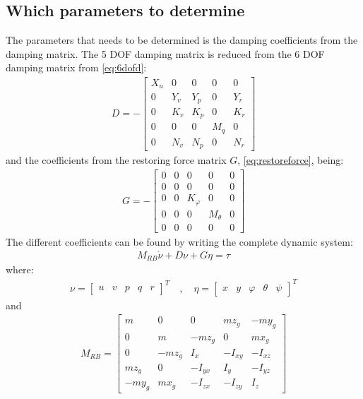 \subsection{Which parameters to determine}
The parameters that needs to be determined is the damping coefficients
from the damping matrix. The 5 \ac{DOF} damping matrix is reduced from the 6 \ac{DOF} damping matrix from \ref{eq:6dofd}:
\begin{align}
D = -
\begin{bmatrix}
X_u & 0 & 0 & 0 & 0\\
0 & Y_v & Y_p & 0 & Y_r\\
0 & K_v & K_p & 0 & K_r\\
0 & 0 & 0 & M_q & 0\\
0 & N_v & N_p & 0 & N_r
\end{bmatrix}
\end{align}
and the coefficients from the restoring force matrix $G$, \ref{eq:restoreforce}, being:
\begin{align}
G = -
\begin{bmatrix}
0 & 0 & 0 & 0 & 0\\
0 & 0 & 0 & 0 & 0\\
0 & 0 & K_\varphi & 0 & 0\\
0 & 0 & 0 & M_\theta & 0\\
0 & 0 & 0 & 0 & 0
\end{bmatrix}
\end{align}
The different coefficients can be found by writing the complete dynamic system:
\begin{align}
M_{RB} \dot \nu + D\nu + G\eta = \tau
\end{align}
where:
\begin{align}
\nu =
\begin{bmatrix}
u & v & p & q & r
\end{bmatrix}^T
\quad , \quad
\eta =
\begin{bmatrix}
x & y & \varphi & \theta & \psi
\end{bmatrix}^T
\end{align}
and
\begin{align}
M_{RB} =
\begin{bmatrix}
m & 0 & 0 & mz_g & -my_g\\
0 & m & -mz_g & 0 & mx_g\\
0 & -mz_g & I_x & -I_{xy} & -I_{xz}\\
mz_g & 0 & -I_{yx} & I_y & -I_{yz}\\
-my_g & mx_g & -I_{zx} & -I_{zy} & I_z
\end{bmatrix}
\end{align}

